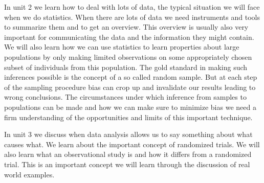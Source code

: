 \documentclass[
  letterpaper,
]{scrbook}
\begin{document}
\begin{tcolorbox}
\begin{tcolorbox}[enhanced jigsaw, toprule=.15mm, colbacktitle=quarto-callout-note-color!10!white, breakable, coltitle=black, rightrule=.15mm, bottomtitle=1mm, bottomrule=.15mm, titlerule=0mm, title=\textcolor{quarto-callout-note-color}{\faInfo}\hspace{0.5em}{Unit 2: Summarizing and Communication lots of data; From limited data to
populations}, arc=.35mm, leftrule=.75mm, toptitle=1mm, left=2mm, opacityback=0, opacitybacktitle=0.6, colframe=quarto-callout-note-color-frame, colback=white]
In unit 2 we learn how to deal with lots of data, the typical situation
we will face when we do statistics. When there are lots of data we need
instruments and tools to summarize them and to get an overview. This
overview is usually also very important for communicating the data and
the information they might contain. We will also learn how we can use
statistics to learn properties about large populations by only making
limited observations on some appropriately chosen subset of individuals
from this population. The gold standard in making such inferences
possible is the concept of a so called random sample. But at each step
of the sampling procedure bias can crop up and invalidate our results
leading to wrong conclusions. The circumstances under which inference
from samples to populations can be made and how we can make sure to
minimize bias we need a firm understanding of the opportunities and
limits of this important technique.
\end{tcolorbox}

\begin{tcolorbox}[enhanced jigsaw, toprule=.15mm, colbacktitle=quarto-callout-note-color!10!white, breakable, coltitle=black, rightrule=.15mm, bottomtitle=1mm, bottomrule=.15mm, titlerule=0mm, title=\textcolor{quarto-callout-note-color}{\faInfo}\hspace{0.5em}{Unit 3: What causes what?}, arc=.35mm, leftrule=.75mm, toptitle=1mm, left=2mm, opacityback=0, opacitybacktitle=0.6, colframe=quarto-callout-note-color-frame, colback=white]
In unit 3 we discuss when data analysis allows us to say something about
what causes what. We learn about the important concept of randomized
trials. We will also learn what an observational study is and how it
differs from a randomized trial. This is an important concept we will
learn through the discussion of real world examples.
\end{tcolorbox}


\end{tcolorbox}
\end{document}
